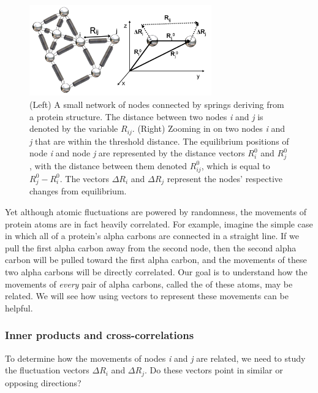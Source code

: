 \begin{figure}[h]
	\centering
	\mySfFamily
	\includegraphics[width = 0.7\textwidth]{../images/gaussian_fluctuations.png}
	\caption{(Left) A small network of nodes connected by springs deriving from a protein structure. The distance between two nodes \textit{i} and \textit{j} is denoted by the variable $ R_{ij} $. (Right) Zooming in on two nodes \textit{i} and \textit{j} that are within the threshold distance. The equilibrium positions of node \textit{i} and node \textit{j} are represented by the distance vectors $ R_i^0 $ and $ R_j^0 $, with the distance between them denoted $ R_{ij}^0 $, which is equal to $ R_j^0 - R_i^0 $. The vectors $ \Delta R_i $ and $ \Delta R_j $ represent the nodes' respective changes from equilibrium.}
	\label{fig:gaussian_fluctuations}
\end{figure}

Yet although atomic fluctuations are powered by randomness, the movements of protein atoms are in fact heavily correlated. For example, imagine the simple case in which all of a protein's alpha carbons are connected in a straight line. If we pull the first alpha carbon away from the second node, then the second alpha carbon will be pulled toward the first alpha carbon, and the movements of these two alpha carbons will be directly correlated. Our goal is to understand how the movements of \textit{every} pair of alpha carbons, called the  of these atoms, may be related. We will see how using vectors to represent these movements can be helpful.

\FloatBarrier
{}
\subsubsection{Inner products and cross-correlations}

To determine how the movements of nodes \textit{i} and \textit{j} are related, we need to study the fluctuation vectors $ \Delta R_i $ and $ \Delta R_j $. Do these vectors point in similar or opposing directions?

